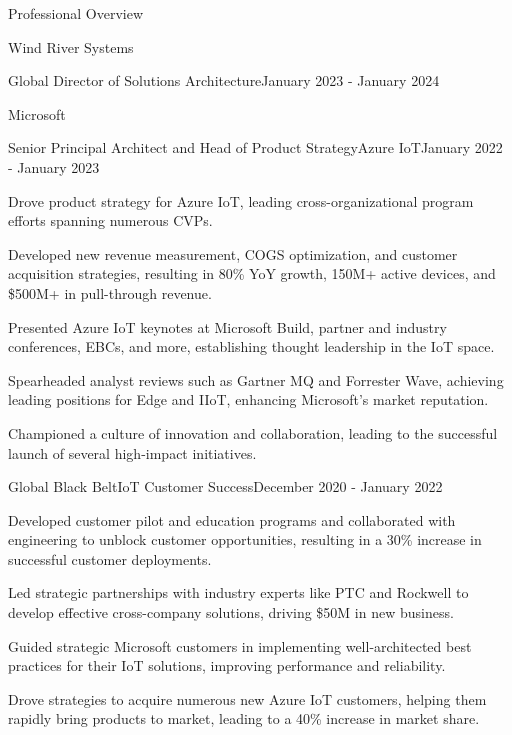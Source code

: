 \documentclass{resume} %
\begin{document}
\begin{rSection}{Professional Overview}
\begin{rCompany}{Wind River Systems}{}{}
\begin{rSubSubsection}{Global Director of Solutions Architecture}{}{January 2023 - January 2024}
    \end{rSubSubsection}
  \end{rCompany}

  \begin{rCompany}{Microsoft}{}{}

    \begin{rSubSubsection}{Senior Principal Architect and Head of Product Strategy}{Azure IoT}{January 2022 - January 2023}

        \item Drove product strategy for Azure IoT, leading cross-organizational program efforts spanning numerous CVPs.
        \item Developed new revenue measurement, COGS optimization, and customer acquisition strategies, resulting in 80\% YoY growth, 150M+ active devices, and \$500M+ in pull-through revenue.
        \item Presented Azure IoT keynotes at Microsoft Build, partner and industry conferences, EBCs, and more, establishing thought leadership in the IoT space.
        \item Spearheaded analyst reviews such as Gartner MQ and Forrester Wave, achieving leading positions for Edge and IIoT, enhancing Microsoft's market reputation.
        \item Championed a culture of innovation and collaboration, leading to the successful launch of several high-impact initiatives.
    
    \end{rSubSubsection}
    
    \begin{rSubSubsection}{Global Black Belt}{IoT Customer Success}{December 2020 - January 2022}
        \item Developed customer pilot and education programs and collaborated with engineering to unblock customer opportunities, resulting in a 30\% increase in successful customer deployments.
        \item Led strategic partnerships with industry experts like PTC and Rockwell to develop effective cross-company solutions, driving \$50M in new business.
        \item Guided strategic Microsoft customers in implementing well-architected best practices for their IoT solutions, improving performance and reliability.
        \item Drove strategies to acquire numerous new Azure IoT customers, helping them rapidly bring products to market, leading to a 40\% increase in market share.
    \end{rSubSubsection}
    

\end{rCompany}
\end{rSection}
\end{document}
